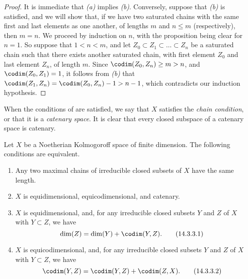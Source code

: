 \begin{proof}
\label{proof-0.14.3.2}
It is immediate that \emph{(a)} implies \emph{(b)}.
Conversely, suppose that \emph{(b)} is satisfied, and we will show that, if we have two saturated chains with the same first and last elements as one another, of lengths $m$ and $n\leq m$ (respectively), then $m=n$.
We proceed by induction on $n$, with the proposition being clear for $n=1$.
So suppose that $1<n<m$, and let $Z_0\subset Z_1\subset\ldots\subset Z_n$ be a
saturated chain such that there exists another saturated chain, with first element $Z_0$ and last element $Z_n$, of length $m$.
Since $\codim(Z_0,Z_n)\geq m>n$, and $\codim(Z_0,Z_1)=1$, it follows from \emph{(b)} that $\codim(Z_1,Z_n)=\codim(Z_0,Z_n)-1>n-1$, which contradicts our induction hypothesis.
\end{proof}

When the conditions of  are satisfied, we say that $X$ satisfies the \emph{chain condition}, or that it is a \emph{catenary space}.
It is clear that every closed subspace of a catenary space is catenary.

\begin{prop}[14.3.3]
\label{0.14.3.3}
Let $X$ be a Noetherian Kolmogoroff space of finite dimension.
The following conditions are equivalent.
\begin{enumerate}[label=\emph{(\alph*)}]
    \item Any two maximal chains of irreducible closed subsets of $X$ have the same length.
    \item $X$ is equidimensional, equicodimensional, and catenary.
    \item $X$ is equidimensional, and, for any irreducible closed subsets $Y$ and $Z$ of $X$ with $Y\subset Z$, we have
        \begin{equation*}
        \label{0.14.3.3.1}
            \dim(Z) = \dim(Y)+\codim(Y,Z).\tag{14.3.3.1}
        \end{equation*}
    \item $X$ is equicodimensional, and, for any irreducible closed subsets $Y$ and $Z$ of $X$ with $Y\subset Z$, we have
        \begin{equation*}
        \label{0.14.3.3.2}
            \codim(Y,Z) = \codim(Y,Z)+\codim(Z,X).\tag{14.3.3.2}
        \end{equation*}
\end{enumerate}
\end{prop}

